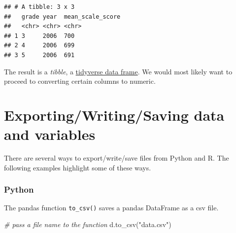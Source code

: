 \documentclass[
]{book}
\newenvironment{Shaded}{\begin{snugshade}}{\end{snugshade}}
\newcommand{\CommentTok}[1]{\textcolor[rgb]{0.56,0.35,0.01}{\textit{#1}}}
\newcommand{\DecValTok}[1]{\textcolor[rgb]{0.00,0.00,0.81}{#1}}
\newcommand{\FunctionTok}[1]{\textcolor[rgb]{0.00,0.00,0.00}{#1}}
\newcommand{\NormalTok}[1]{#1}
\newcommand{\OtherTok}[1]{\textcolor[rgb]{0.56,0.35,0.01}{#1}}
\newcommand{\SpecialCharTok}[1]{\textcolor[rgb]{0.00,0.00,0.00}{#1}}
\newcommand{\StringTok}[1]{\textcolor[rgb]{0.31,0.60,0.02}{#1}}
\begin{document}
\begin{Shaded}
\end{Shaded}

\begin{verbatim}
## # A tibble: 3 x 3
##   grade year  mean_scale_score
##   <chr> <chr> <chr>           
## 1 3     2006  700             
## 2 4     2006  699             
## 3 5     2006  691
\end{verbatim}

The result is a \emph{tibble}, a \href{https://tibble.tidyverse.org/}{tidyverse data frame}. We would most likely want to proceed to converting certain columns to numeric.

\hypertarget{exportingwritingsaving-data-and-variables}{%
\section{Exporting/Writing/Saving data and variables}\label{exportingwritingsaving-data-and-variables}}

There are several ways to export/write/save files from Python and R. The following examples highlight some of these ways.

\hypertarget{python-16}{%
\subsubsection*{Python}\label{python-16}}

The pandas function \texttt{to\_csv()} saves a pandas DataFrame as a csv file.

\begin{Shaded}
\begin{Highlighting}[]
\CommentTok{\# pass a file name to the function}
\NormalTok{d.to\_csv(}\StringTok{"data.csv"}\NormalTok{)}
\end{Highlighting}
\end{Shaded}
\end{document}

